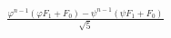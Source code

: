 \documentclass[preview]{standalone}
\begin{document}
\begin{align*}
\frac{\varphi^{n-1}(\varphi F_1 + F_0) - \psi^{n-1}(\psi F_1 + F_0)}{\sqrt{5}}
\end{align*}
\end{document}
